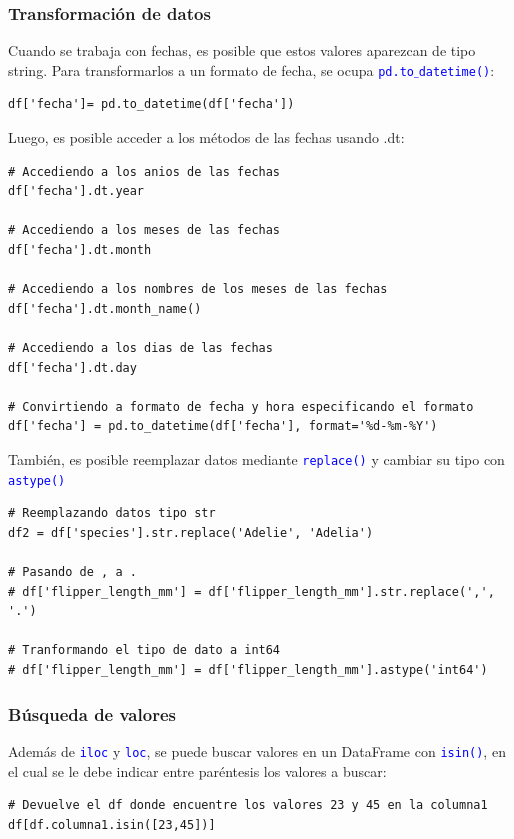\documentclass[a4paper, 12pt]{book}
\begin{document}
\subsubsection{Transformación de datos}
Cuando se trabaja con fechas, es posible que estos valores aparezcan de tipo string. Para transformarlos a un formato de fecha, se ocupa \texttt{\textcolor{blue}{pd.to$\_$datetime()}}:
\begin{verbatim}
df['fecha']= pd.to_datetime(df['fecha'])
\end{verbatim}
Luego, es posible acceder a los métodos de las fechas usando .dt:
\begin{verbatim}
# Accediendo a los anios de las fechas
df['fecha'].dt.year
	
# Accediendo a los meses de las fechas
df['fecha'].dt.month
	
# Accediendo a los nombres de los meses de las fechas
df['fecha'].dt.month_name()
	
# Accediendo a los dias de las fechas
df['fecha'].dt.day
	
# Convirtiendo a formato de fecha y hora especificando el formato
df['fecha'] = pd.to_datetime(df['fecha'], format='%d-%m-%Y')
\end{verbatim}
También, es posible reemplazar datos mediante \texttt{\textcolor{blue}{replace()}} y cambiar su tipo con \texttt{\textcolor{blue}{astype()}}
\begin{verbatim}
# Reemplazando datos tipo str
df2 = df['species'].str.replace('Adelie', 'Adelia')

# Pasando de , a .
# df['flipper_length_mm'] = df['flipper_length_mm'].str.replace(',', '.')

# Tranformando el tipo de dato a int64
# df['flipper_length_mm'] = df['flipper_length_mm'].astype('int64')
\end{verbatim}


\subsubsection{Búsqueda de valores}
Además de \texttt{\textcolor{blue}{iloc}} y \texttt{\textcolor{blue}{loc}}, se puede buscar valores en un DataFrame con \texttt{\textcolor{blue}{isin()}}, en el cual se le debe indicar entre paréntesis los valores a buscar:
\begin{verbatim}
# Devuelve el df donde encuentre los valores 23 y 45 en la columna1
df[df.columna1.isin([23,45])]
\end{verbatim}
\end{document}
